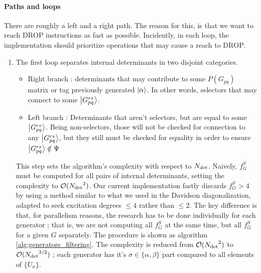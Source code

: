\documentclass[./thesis.tex]{subfiles}
\newcommand{\Gpqrs}{\ket{G^{rs}_{pq}}}
\begin{document}
\paragraph{Paths and loops}
There are roughly a left and a right path. The reason for this, is that we want to reach $\text{DROP}$ instructions as fast as possible. Incidently, in each loop, the implementation should prioritize operations that may cause a reach to $\text{DROP}$.


\begin{enumerate}

\item
The first loop separates internal determinants in two disjoint categories.


\begin{itemize}
\item
Right branch : determinants that may contribute to some $P(G_{pq})$ matrix or tag previously generated $\ket \alpha$. In other words, selectors that may connect to some $\ket {G_{pq}^{rs}}$. 

\item
Left branch : Determinants that aren't selectors, but are equal to some $\ket {G_{pq}^{rs}}$. Being non-selectors, those will not be checked for connection to any $\ket {G_{pq}^{rs}}$, but they still must be checked for equality in order to ensure $\ket {G_{pq}^{rs}} \notin \Psi$
\end{itemize}
This step sets the algorithm's complexity with respect to ${N_\text{det}}$. Naively, $f_G^S$ must be computed for all pairs of internal determinants, setting the complexity to $\mathcal{O}({N_\text{det}}^2)$. Our current implementation fastly discards $f_G^S > 4$ by using a method similar to what we used in the Davidson diagonalization, adapted to seek excitation degrees $\leq 4$ rather than $\leq 2$. The key difference is that, for parallelism reasons, the research has to be done individually for each generator ; that is, we are not computing all $f_G^S$ at the same time, but all $f_G^S$ for a given $G$ separately. The procedure is shown as algorithm \ref{alg:generators_filtering}. The complexity is reduced from $\mathcal{O}({N_\text{det}}^2)$ to $\mathcal{O}({N_\text{det}}^{3/2})$ ; each generator has it's $\sigma \in \{\alpha, \beta\}$ part compared to all elements of $\{U_\sigma\}$.


\end{enumerate}
\end{document}
